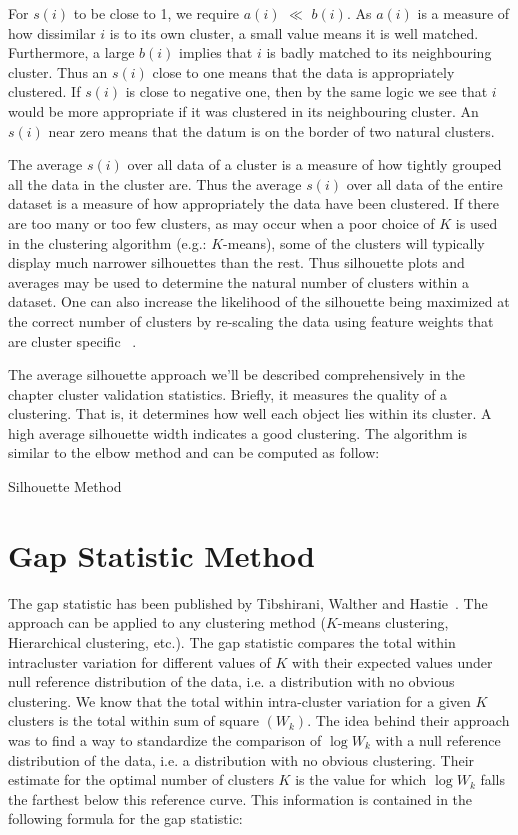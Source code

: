 For $s(i)$ to be close to 1, we require $a(i)$ $\ll$ $b(i)$. As $a(i)$ is a measure of how dissimilar $i$
is to its own cluster, a small value means it is well matched. Furthermore, a large $b(i)$ implies that $i$
is badly matched to its neighbouring cluster. Thus an $s(i)$ close to one means that the data is appropriately
clustered. If $s(i)$ is close to negative one, then by the same logic we see that $i$ would be more appropriate
if it was clustered in its neighbouring cluster. An $s(i)$ near zero means that the datum is on the border of
two natural clusters.

The average $s(i)$ over all data of a cluster is a measure of how tightly grouped all the data in the cluster are.
Thus the average $s(i)$ over all data of the entire dataset is a measure of how appropriately the data have been
clustered. If there are too many or too few clusters, as may occur when a poor choice of $K$ is used in the
clustering algorithm (e.g.: $K$-means), some of the clusters will typically display much narrower silhouettes
than the rest. Thus silhouette plots and averages may be used to determine the natural number of clusters
within a dataset. One can also increase the likelihood of the silhouette being maximized at the correct number
of clusters by re-scaling the data using feature weights that are cluster specific ~\cite{hennig15}.

The average silhouette approach we'll be described comprehensively in the chapter cluster validation statistics.
Briefly, it measures the quality of a clustering. That is, it determines how well each object lies within its
cluster. A high average silhouette width indicates a good clustering. The algorithm is similar to the elbow
method and can be computed as follow:

\begin{algorithm}
  \caption{Silhouette Method}
  \label{alg2}
  \begin{algorithmic}
    
  \end{algorithmic}
\end{algorithm}

\section{Gap Statistic Method}
The gap statistic has been published by Tibshirani, Walther and Hastie~\cite{tibshirani01}.
The approach can be applied to any clustering method ($K$-means clustering, Hierarchical clustering, etc.).
The gap statistic compares the total within intracluster variation for different values of $K$ with their
expected values under null reference distribution of the data, i.e. a distribution with no obvious clustering.
We know that the total within intra-cluster variation for a given $K$ clusters is the total within sum of square $(W_k)$.
The idea behind their approach was to find a way to standardize the comparison of $\log W_k$ with a null reference
distribution of the data, i.e. a distribution with no obvious clustering. Their estimate for the optimal number of
clusters $K$ is the value for which $\log W_k$ falls the farthest below this reference curve. This information is
contained in the following formula for the gap statistic:


